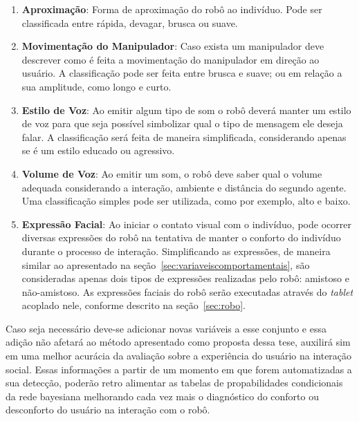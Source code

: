\begin{enumerate}
	\item \textbf{Aproximação}: Forma de aproximação do robô ao indivíduo. Pode ser classificada entre rápida, devagar, brusca ou suave.
	\item \textbf{Movimentação do Manipulador}: Caso exista um manipulador deve descrever como é feita a movimentação do manipulador em direção ao usuário. A classificação pode ser feita entre brusca e suave; ou em relação a sua amplitude, como longo e curto.
	\item \textbf{Estilo de Voz}: Ao emitir algum tipo de som o robô deverá manter um estilo de voz para que seja possível simbolizar qual o tipo de mensagem ele deseja falar. A classificação será feita de maneira simplificada, considerando apenas se é um estilo educado ou agressivo.
	\item \textbf{Volume de Voz}: Ao emitir um som, o robô deve saber qual o volume adequada considerando a interação, ambiente e distância do segundo agente. Uma classificação simples pode ser utilizada, como por exemplo, alto e baixo.
	\item \textbf{Expressão Facial}: Ao iniciar o contato visual com o indivíduo, pode ocorrer diversas expressões do robô na tentativa de manter o conforto do indivíduo durante o processo de interação. Simplificando as expressões, de maneira similar ao apresentado na seção~\ref{sec:variaveiscomportamentais}, são consideradas apenas dois tipos de expressões realizadas pelo robô: amistoso e não-amistoso. As expressões faciais do robô serão executadas através do \emph{tablet} acoplado nele, conforme descrito na seção~\ref{sec:robo}.
\end{enumerate}

Caso seja necessário deve-se adicionar novas variáveis a esse conjunto e essa adição não afetará ao método apresentado como proposta dessa tese, auxilirá sim em uma melhor acurácia da avaliação sobre a experiência do usuário na interação social. Essas informações a partir de um momento em que forem automatizadas a sua detecção, poderão retro alimentar as tabelas de propabilidades condicionais da rede bayesiana melhorando cada vez mais o diagnóstico do conforto ou desconforto do usuário na interação com o robô.
